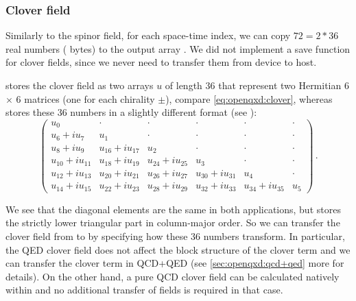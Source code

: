 \subsubsection{Clover field}

Similarly to the spinor field, for each space-time index, we can copy $72 = 2*36$ real numbers (\ie {} bytes) to the output array .
We did not implement a save function for clover fields, since we never need to transfer them from device to host.

\Openqxd stores the clover field as two arrays $u$ of length $36$ that represent two Hermitian 6$\times$ 6 matrices (one for each chirality $\pm$), compare \cref{eq:openqxd:clover}, whereas \quda stores these 36 numbers in a slightly different format (see  \cite{QUDApaper}):
\begin{equation}
\begin{pmatrix}
u_0              & \cdot            & \cdot            & \cdot            & \cdot            & \cdot \\
u_6 + iu_7       & u_1              & \cdot            & \cdot            & \cdot            & \cdot \\
u_8 + iu_9       & u_{16} + iu_{17} & u_2              & \cdot            & \cdot            & \cdot \\
u_{10} + iu_{11} & u_{18} + iu_{19} & u_{24} + iu_{25} & u_3              & \cdot            & \cdot \\
u_{12} + iu_{13} & u_{20} + iu_{21} & u_{26} + iu_{27} & u_{30} + iu_{31} & u_4              & \cdot \\
u_{14} + iu_{15} & u_{22} + iu_{23} & u_{28} + iu_{29} & u_{32} + iu_{33} & u_{34} + iu_{35} & u_5
\end{pmatrix}\,.
\end{equation}

We see that the diagonal elements are the same in both applications, but \quda stores the strictly lower triangular part in column-major order.
So we can transfer the clover field from \openqxd to \quda by specifying how these 36 numbers transform. In particular, the QED
clover field does not affect the block structure of the clover term and we can transfer the clover term in QCD+QED (see \cref{sec:openqxd:qcd+qed} more for details).
On the other hand, a pure QCD clover field can be calculated natively within \quda and no additional transfer of fields is required in that case.

